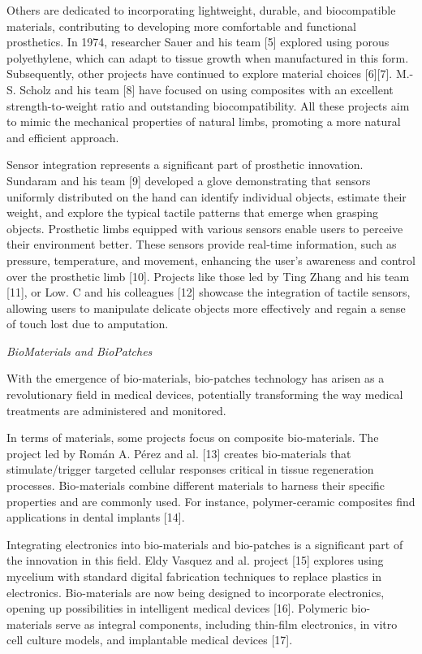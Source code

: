Others are dedicated to incorporating lightweight, durable, and biocompatible materials, contributing to developing more comfortable and functional prosthetics. In 1974, researcher Sauer and his team [5] explored using porous polyethylene, which can adapt to tissue growth when manufactured in this form. Subsequently, other projects have continued to explore material choices [6][7]. M.-S. Scholz and his team [8] have focused on using composites with an excellent strength-to-weight ratio and outstanding biocompatibility. All these projects aim to mimic the mechanical properties of natural limbs, promoting a more natural and efficient approach.

Sensor integration represents a significant part of prosthetic innovation. Sundaram and his team [9] developed a glove demonstrating that sensors uniformly distributed on the hand can identify individual objects, estimate their weight, and explore the typical tactile patterns that emerge when grasping objects. Prosthetic limbs equipped with various sensors enable users to perceive their environment better. These sensors provide real-time information, such as pressure, temperature, and movement, enhancing the user's awareness and control over the prosthetic limb [10]. Projects like those led by Ting Zhang and his team [11], or Low. C and his colleagues [12] showcase the integration of tactile sensors, allowing users to manipulate delicate objects more effectively and regain a sense of touch lost due to amputation.

\textit{BioMaterials and BioPatches}

With the emergence of bio-materials, bio-patches technology has arisen as a revolutionary field in medical devices, potentially transforming the way medical treatments are administered and monitored.

In terms of materials, some projects focus on composite bio-materials. The project led by Román A. Pérez and al. [13] creates bio-materials that stimulate/trigger targeted cellular responses critical in tissue regeneration processes. Bio-materials combine different materials to harness their specific properties and are commonly used. For instance, polymer-ceramic composites find applications in dental implants [14].

Integrating electronics into bio-materials and bio-patches is a significant part of the innovation in this field. Eldy Vasquez and al. project [15] explores using mycelium with standard digital fabrication techniques to replace plastics in electronics. Bio-materials are now being designed to incorporate electronics, opening up possibilities in intelligent medical devices [16]. Polymeric bio-materials serve as integral components, including thin-film electronics, in vitro cell culture models, and implantable medical devices [17].

